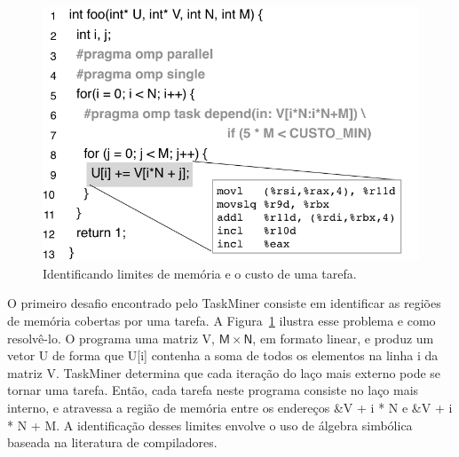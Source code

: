 \documentclass[sigplan,10pt,review]{acmart}
\newcommand\Taskminer{\mbox{\textsf{TaskMiner}}}
\begin{document}
\begin{figure}[b!]
\begin{center}
\includegraphics[width=1\columnwidth]{images/ex_Regions}
\caption{Identificando limites de memória e o custo de uma tarefa.}
\label{fig:ex_Regions}
\end{center}
\end{figure}

O primeiro desafio encontrado pelo \Taskminer{} consiste em 
identificar as regiões de memória cobertas por uma tarefa.
A Figura~\ref{fig:ex_Regions} ilustra esse problema e como resolvê-lo. O programa
uma matriz \textsf{V}, $\mathsf{M}\times\mathsf{N}$, em formato linear,
e produz um vetor  \textsf{U} de forma que  \textsf{U[i]} contenha a soma de todos
os elementos na linha  \textsf{i} da matriz  \textsf{V}. {\Taskminer} determina que cada
iteração do laço mais externo pode se tornar uma tarefa. Então, cada tarefa neste programa
consiste no laço mais interno, e atravessa a região de memória entre os endereços  \textsf{\&V + i * N} e
 \textsf{\&V + i * N + M}. A identificação desses limites envolve o uso de álgebra simbólica baseada
 na literatura de compiladores.
 
\end{document}
